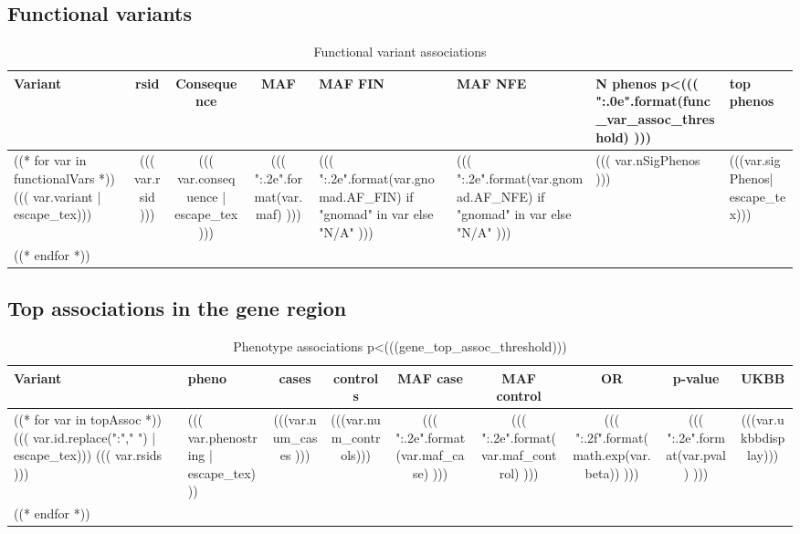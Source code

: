 \documentclass{article}
\begin{document}
\begin{landscape}
\begingroup
\renewcommand{\arraystretch}{1.5}
\section{ Functional variants }
\begin{longtable}{p{1.5cm}|c|c|c|C{1.3cm}|C{1.3cm}|C{1.2cm}|L{4.8cm} }
\caption{ Functional variant associations }\\
Variant & rsid & Consequence & MAF & MAF FIN & MAF NFE & N phenos p\textless((( "{:.0e}".format(func_var_assoc_threshold) ))) & top phenos \\
\hline
((* for var in functionalVars *))
    ((( var.variant | escape_tex))) & ((( var.rsid ))) & (((  var.consequence | escape_tex))) & ((( "{:.2e}".format(var.maf) ))) & ((( "{:.2e}".format(var.gnomad.AF_FIN) if "gnomad" in var else "N/A" ))) & ((( "{:.2e}".format(var.gnomad.AF_NFE) if "gnomad" in var else "N/A" ))) & ((( var.nSigPhenos ))) & (((var.sigPhenos| escape_tex)))  \\
((* endfor *))

\end{longtable}
 \end{landscape}
\newpage
\begin{landscape}
\section{ Top associations in the gene region }
\begin{longtable}{ >{\RaggedRight}p{3cm}|>{\RaggedRight}p{3cm}|c|c|c|c|c|c|c }
\caption{ Phenotype associations p\textless (((gene_top_assoc_threshold))) }\\
    Variant & pheno & cases & controls & MAF case & MAF control & OR & p-value & UKBB \\
\hline
((* for var in topAssoc *))
    ((( var.id.replace(":"," ") | escape_tex))) \newline ((( var.rsids ))) & ((( var.phenostring | escape_tex))) & (((var.num_cases ))) & (((var.num_controls))) & ((( "{:.2e}".format(var.maf_case) ))) & ((( "{:.2e}".format(var.maf_control) ))) & ((( "{:.2f}".format(math.exp(var.beta)) ))) & ((( "{:.2e}".format(var.pval) ))) & (((var.ukbbdisplay)))\\
((* endfor *))
\end{longtable}
\end{landscape}


\newpage
\end{document}
